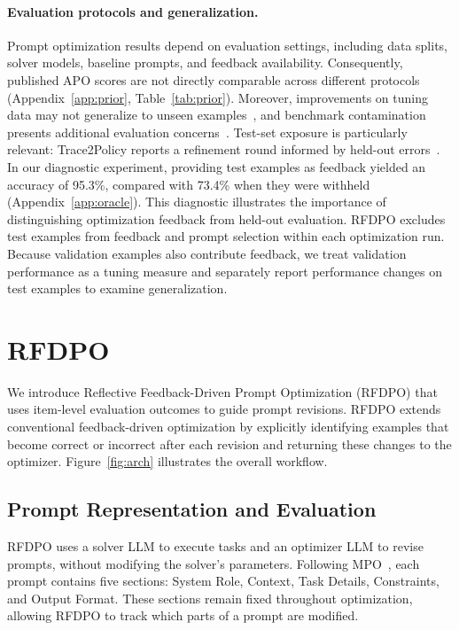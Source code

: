 \documentclass[10pt]{article} %
\begin{document}
\paragraph{Evaluation protocols and generalization.}
Prompt optimization results depend on evaluation settings, including data splits, solver models, baseline prompts, and feedback availability. Consequently, published APO scores are not directly comparable across different protocols (Appendix~\ref{app:prior}, Table~\ref{tab:prior}). Moreover, improvements on tuning data may not generalize to unseen examples~\citep{recht2019imagenet}, and benchmark contamination presents additional evaluation concerns~\citep{oren2023proving}. Test-set exposure is particularly relevant: Trace2Policy reports a refinement round informed by held-out errors~\citep{zha2026trace2policy}. In our diagnostic experiment, providing test examples as feedback yielded an accuracy of 95.3\%, compared with 73.4\% when they were withheld (Appendix~\ref{app:oracle}). This diagnostic illustrates the importance of distinguishing optimization feedback from held-out evaluation. RFDPO excludes test examples from feedback and prompt selection within each optimization run. Because validation examples also contribute feedback, we treat validation performance as a tuning measure and separately report performance changes on test examples to examine generalization.

\section{RFDPO}
\label{sec:method}

We introduce Reflective Feedback-Driven Prompt Optimization (RFDPO) that uses item-level evaluation outcomes to guide prompt revisions. RFDPO extends conventional feedback-driven optimization by explicitly identifying examples that become correct or incorrect after each revision and returning these changes to the optimizer. Figure~\ref{fig:arch} illustrates the overall workflow.

\subsection{Prompt Representation and Evaluation}

RFDPO uses a solver LLM to execute tasks and an optimizer LLM to revise prompts, without modifying the solver's parameters. Following MPO~\citep{sharma2026mpo}, each prompt contains five sections: System Role, Context, Task Details, Constraints, and Output Format. These sections remain fixed throughout optimization, allowing RFDPO to track which parts of a prompt are modified.
\end{document}
